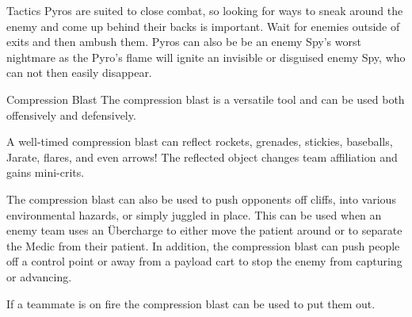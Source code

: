 Tactics
Pyros are suited to close combat, so looking for ways to sneak around the enemy and come up behind their backs is important. Wait for enemies outside of exits and then ambush them.  
Pyros can also be be an enemy Spy's worst nightmare as the Pyro's flame will ignite an invisible or disguised enemy Spy, who can not then easily disappear.

Compression Blast
The compression blast is a versatile tool and can be used both offensively and defensively.

A well-timed compression blast can reflect rockets, grenades, stickies, baseballs, Jarate, flares, and even arrows! The reflected object changes team affiliation and gains mini-crits.

The compression blast can also be used to push opponents off cliffs, into various environmental hazards, or simply juggled in place. This can be used when an enemy team uses an Übercharge to either move the patient around or to separate the Medic from their patient. In addition, the compression blast can push people off a control point or away from a payload cart to stop the enemy from capturing or advancing.

If a teammate is on fire the compression blast can be used to put them out.
